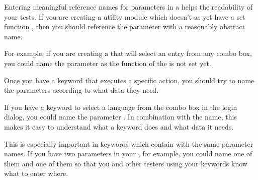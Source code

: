 Entering meaningful reference names for parameters in a \gdcase{}  helps the readability of your tests. If you are creating a utility module which doesn't as yet have a set function , then you should reference the parameter with a reasonably abstract name. 

For example, if you are creating a \gdcase{} that will select an entry from any combo box, you could name the parameter  as the function of the \gdcase{} is not set yet. 

Once you have a keyword that executes a specific action, you should try to name the parameters according to what data they need. 

If you have a keyword to select a language from the combo box in the login dialog, you could name the parameter . In combination with the \gdcase{} name, this makes it easy to understand what a keyword does and what data it needs. 

This is especially important in keywords which contain \gdcases{} with the same parameter names. If you have two  parameters in your \gdcases{}, for example, you could name one of them  and one of them  so that you and other testers using your keywords know what to enter where. 

